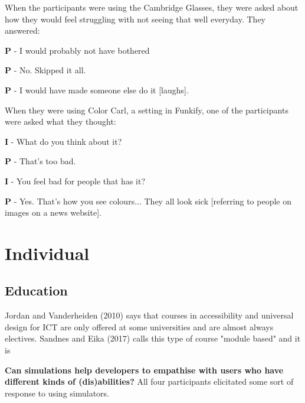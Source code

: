 When the participants were using the Cambridge Glasses, they were asked about how they would feel struggling with not seeing that well everyday. They answered: 
\begin{displayquote}
    \textbf{P} - I would probably not have bothered
    
    \textbf{P} - No. Skipped it all.
    
    \textbf{P} - I would have made someone else do it [laughs].
\end{displayquote}

When they were using Color Carl, a setting in Funkify, one of the participants were asked what they thought:
\begin{displayquote}
    \textbf{I} - What do you think about it?
    
    \textbf{P} - That's too bad.
    
    \textbf{I} - You feel bad for people that has it?
    
    \textbf{P} - Yes. That's how you see colours... They all look sick [referring to people on images on a news website].
\end{displayquote}

\section{Individual}
\subsection{Education}
Jordan and Vanderheiden (2010) says that courses in accessibility and universal design for ICT are only offered at some universities and are almost always electives. Sandnes and Eika (2017) calls this type of course "module based" and it is



\textbf{Can simulations help developers to empathise with users who have different kinds of (dis)abilities?}
All four participants elicitated some sort of response to using simulators. 

